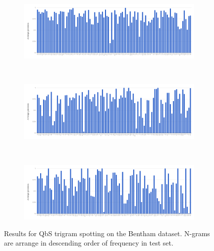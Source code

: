 \documentclass[ms,electronic,twosidetoc,letterpaper,chaptercenter,parttop,lof,lot]{byumsphd}
\begin{document}
\begin{figure}
\centering
\begin{subfigure}{.99\textwidth}
  \centering
  \includegraphics[width=.99\linewidth]{benthamTri1Spot}
  \label{fig:benthamTri1Spot}
\end{subfigure}
\\
\begin{subfigure}{.99\textwidth}
  \centering
  \includegraphics[width=.99\linewidth]{benthamTri2Spot}
  \label{fig:benthamTri2Spot}
\end{subfigure}
\\
\begin{subfigure}{.99\textwidth}
  \centering
  \includegraphics[width=.99\linewidth]{benthamTri3Spot}
  \label{fig:benthamTri3Spot}
\end{subfigure}
\caption{Results for QbS trigram spotting on the Bentham dataset. N-grams are arrange in descending order of frequency in test set.}
\label{fig:benthamsub2}
\end{figure}
\end{document}

